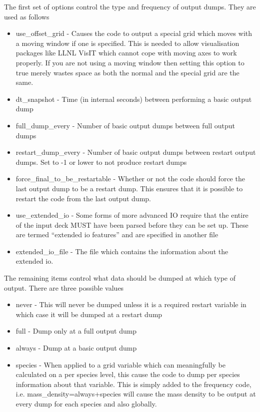 \documentclass[12pt]{article}
\begin{document}
The first set of options control the type and frequency of output dumps. They
are used as follows\\
\begin{itemize}
\item use\_offset\_grid - Causes the code to output a special grid which moves
  with a moving window if one is specified. This is needed to allow
  visualisation packages like LLNL VisIT which cannot cope with moving axes to
  work properly. If you are not using a moving window then setting this option
  to true merely wastes space as both the normal and the special grid are the
  same.
\item dt\_snapshot - Time (in internal seconds) between performing a basic
  output dump
\item full\_dump\_every - Number of basic output dumps between full output
  dumps
\item restart\_dump\_every - Number of basic output dumps between restart
  output dumps. Set to -1 or lower to not produce restart dumps
\item force\_final\_to\_be\_restartable - Whether or not the code should force
  the last output dump to be a restart dump. This ensures that it is possible
  to restart the code from the last output dump.
\item use\_extended\_io - Some forms of more advanced IO require that the
  entire of the input deck MUST have been parsed before they can be set
  up. These are termed ``extended io features'' and are specified in another
  file
\item extended\_io\_file - The file which contains the information about the
  extended io.
\end{itemize}

The remaining items control what data should be dumped at which type of
output. There are three possible values\\
\begin{itemize}
\item never - This will never be dumped unless it is a required restart
  variable in which case it will be dumped at a restart dump
\item full - Dump only at a full output dump
\item always - Dump at a basic output dump
\item species - When applied to a grid variable which can meaningfully be
  calculated on a per species level, this cause the code to dump per species
  information about that variable. This is simply added to the frequency code,
  i.e. mass\_density=always+species will cause the mass density to be output
  at every dump for each species and also globally.
\end{itemize}
\end{document}
